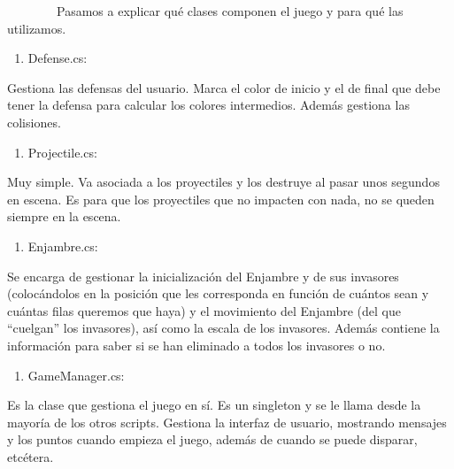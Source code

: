 
~~~~~~~~Pasamos a explicar qué clases componen el juego y para qué las
utilizamos.

\begin{enumerate}
\def\labelenumi{\arabic{enumi}.}
\itemsep1pt\parskip0pt
\item
  Defense.cs:
\end{enumerate}

Gestiona las defensas del usuario. Marca el color de inicio y el de
final que debe tener la defensa para calcular los colores intermedios.
Además gestiona las colisiones.

\begin{enumerate}
\def\labelenumi{\arabic{enumi}.}
\setcounter{enumi}{1}
\itemsep1pt\parskip0pt
\item
  Projectile.cs:
\end{enumerate}

Muy simple. Va asociada a los proyectiles y los destruye al pasar unos
segundos en escena. Es para que los proyectiles que no impacten con
nada, no se queden siempre en la escena.

\begin{enumerate}
\def\labelenumi{\arabic{enumi}.}
\setcounter{enumi}{2}
\itemsep1pt\parskip0pt
\item
  Enjambre.cs:
\end{enumerate}

Se encarga de gestionar la inicialización del Enjambre y de sus
invasores (colocándolos en la posición que les corresponda en función de
cuántos sean y cuántas filas queremos que haya) y el movimiento del
Enjambre (del que ``cuelgan'' los invasores), así como la escala de los
invasores. Además contiene la información para saber si se han eliminado
a todos los invasores o no.

\begin{enumerate}
\def\labelenumi{\arabic{enumi}.}
\setcounter{enumi}{3}
\itemsep1pt\parskip0pt
\item
  GameManager.cs:
\end{enumerate}

Es la clase que gestiona el juego en sí. Es un singleton y se le llama
desde la mayoría de los otros scripts. Gestiona la interfaz de usuario,
mostrando mensajes y los puntos cuando empieza el juego, además de
cuando se puede disparar, etcétera.

